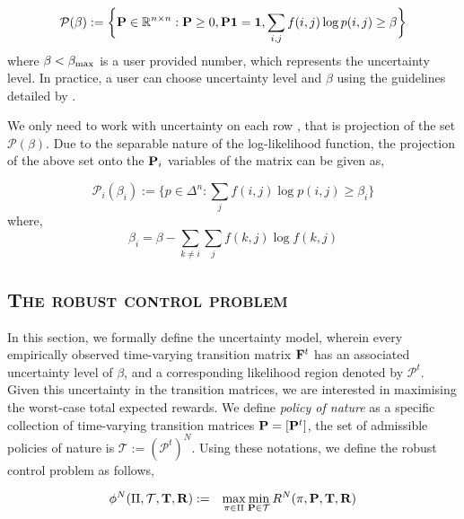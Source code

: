 \begin{equation}
\mathcal{P(\beta)} := \bigg\{{\mathbf{P}} \in \mathbb{R}^{n \times n}: {\mathbf{P}} \geq 0, {\mathbf{P}} \mathbf{1}=\mathbf{1}, \sum_{i,j}f(i,j)\log{p(i,j)} \geq \beta\bigg\} \label{eq:likelihood_region}
\end{equation}
where $\beta < \beta_{\textrm{max}}$ is a user provided number, which represents the uncertainty level. In practice, a user can choose uncertainty level and $\beta$ using the guidelines detailed by \citet{nilim2004robustness}.

We only need to work with uncertainty on each row {\truetransitionmatrix}, that is projection of the set $\mathcal{P(\beta)}$. Due to the separable nature of the log-likelihood function, the projection of the above set onto the ${\mathbf{P}}_i$ variables of the matrix {\truetransitionmatrix} can be given as,

\begin{equation}
\mathcal{P}_i(\beta_i) := \bigg\{p \in \Delta^n : \sum_{j}f(i,j)\log{p(i,j)} \geq \beta_i \bigg\}
\end{equation}
where,
\begin{equation}
\beta_i = \beta - \sum_{k \neq i}\sum_{j}f(k,j)\log{f(k,j)}
\end{equation}

\subsection{\textsc{The robust control problem}}

In this section, we formally define the uncertainty model, wherein every empirically observed time-varying transition matrix $\mathbf{F}^t$ has an associated uncertainty level of $\beta$, and a corresponding likelihood region denoted by $\mathcal{P}^t$. Given this uncertainty in the transition matrices, we are interested in maximising the worst-case total expected rewards. We define \textit{policy of nature} as a specific collection of time-varying transition matrices $\mathbf{P} = [\mathbf{P}^t]$, the set of admissible policies of nature is $\mathcal{T} := (\mathcal{P}^t)^N$. Using these notations, we define the robust control problem as follows,

\begin{eqnarray}
\phi^N(\Pi, \mathcal{T}, \mathbf{T}, \mathbf{R}) &:=& \max_{\pi \in \Pi} \min_{\mathbf{P} \in \mathcal{T}} R^N(\pi, \mathbf{P}, \mathbf{T}, \mathbf{R})
\end{eqnarray}

